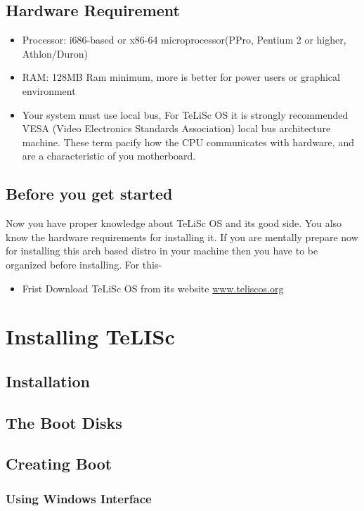 \documentclass[a4paper,12pt]{book}
\begin{document}
\section{Hardware Requirement}

\begin{itemize}
    \item Processor: i686-based or x86-64 microprocessor(PPro, Pentium 2 or higher, Athlon/Duron)
    \item RAM: 128MB Ram minimum, more is better for power users or graphical environment
    \item Your system must use local bus, For TeLiSc OS it is strongly recommended VESA (Video Electronics Standards Association) local bus architecture machine. These term pacify how the CPU communicates with hardware, and are a characteristic of you motherboard. 
\end{itemize}

\section{Before you get started}

Now you have proper knowledge about TeLiSc OS and its good side. You also know the hardware requirements for installing it. If you are mentally prepare now for installing this arch based distro in your machine then you have to be organized before installing. For this-

\begin{itemize}
    \item Frist Download TeLiSc OS from its website \url{www.teliscos.org}
\end{itemize}

\chapter{Installing TeLISc}

\section{Installation} 
\section{The Boot Disks}

\section{Creating Boot}
\subsection{Using Windows Interface}
\end{document}
